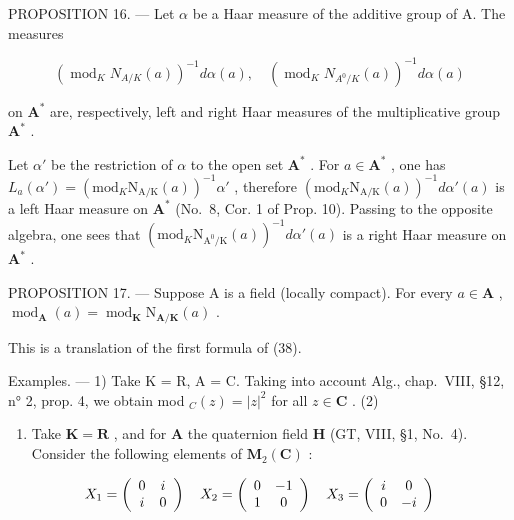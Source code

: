 PROPOSITION 16. --- Let \(\alpha\) be a Haar measure of the additive group of A. The measures

\[
\left(\operatorname{mod} _ {K} N _ {A / K} (a)\right) ^ {- 1} d \alpha (a), \quad \left(\operatorname{mod} _ {K} N _ {A ^ {0} / K} (a)\right) ^ {- 1} d \alpha (a)
\]

on \(\mathbf{A}^*\) are, respectively, left and right Haar measures of the multiplicative group \(\mathbf{A}^*\) .

Let \(\alpha'\) be the restriction of \(\alpha\) to the open set \(\mathbf{A}^*\) . For \(a \in \mathbf{A}^*\) , one has \(L_a(\alpha') = (\mathrm{mod}_K \mathrm{N}_{\mathrm{A}/\mathrm{K}}(a))^{-1} \alpha'\) , therefore \((\mathrm{mod}_K \mathrm{N}_{\mathrm{A}/\mathrm{K}}(a))^{-1} d\alpha'(a)\) is a left Haar measure on \(\mathbf{A}^*\) (No.~8, Cor. 1 of Prop. 10). Passing to the opposite algebra, one sees that \((\mathrm{mod}_K \mathrm{N}_{\mathrm{A}^0/\mathrm{K}}(a))^{-1} d\alpha'(a)\) is a right Haar measure on \(\mathbf{A}^*\) .

PROPOSITION 17. --- Suppose A is a field (locally compact). For every \(a \in \mathbf{A}\) , \(\operatorname{mod}_{\mathbf{A}}(a) = \operatorname{mod}_{\mathbf{K}} \mathrm{N}_{\mathbf{A}/\mathbf{K}}(a)\) .

This is a translation of the first formula of (38).

Examples. --- 1) Take K = R, A = C. Taking into account Alg., chap.~VIII, §12, n° 2, prop. 4, we obtain mod \(_{C}(z) = |z|^{2}\) for all \(z \in \mathbf{C}\) . (2)

\begin{enumerate}
\def\labelenumi{\arabic{enumi})}
\setcounter{enumi}{1}
\tightlist
\item
  Take \(\mathbf{K} = \mathbf{R}\) , and for \(\mathbf{A}\) the quaternion field \(\mathbf{H}\) (GT, VIII, §1, No.~4). Consider the following elements of \(\mathbf{M}_2(\mathbf{C})\) :
\end{enumerate}

\[
X _ {1} = \left( \begin{array}{c c} 0 & i \\ i & 0 \end{array} \right) \quad X _ {2} = \left( \begin{array}{c c} 0 & - 1 \\ 1 & 0 \end{array} \right) \quad X _ {3} = \left( \begin{array}{c c} i & 0 \\ 0 & - i \end{array} \right)
\]

